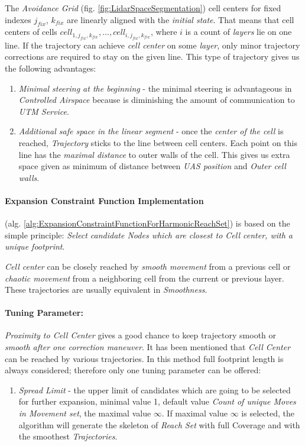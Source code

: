 The \emph{Avoidance Grid} (fig. \ref{fig:LidarSpaceSegmentation}) cell centers for fixed indexes $j_{fix}$, $k_{fix}$ are linearly aligned with the \emph{initial state}. That means that  cell centers of cells $cell_{1,j_{fix},k_{fix}},\dots, cell_{i,j_{fix},k_{fix}}$, where $i$ is a count of \emph{layers} lie on one line.  If the trajectory can achieve \emph{cell center} on some \emph{layer}, only minor trajectory corrections are required to stay on the given line. This type of trajectory gives us the  following advantages:
\begin{enumerate}
    \item\emph{Minimal steering at the beginning} - the minimal steering is advantageous in \emph{Controlled Airspace} because is diminishing the amount of communication to \emph{UTM Service}.
    
    \item\emph{Additional safe space in the linear segment} - once the \emph{center of the cell} is reached, \emph{Trajectory} sticks to the line between cell centers. Each point on this line has the \emph{maximal distance} to outer walls of the cell. This gives us extra space given as minimum of distance between \emph{UAS position} and \emph{Outer cell walls}.
\end{enumerate}

\paragraph{Expansion Constraint Function Implementation} (alg. \ref{alg:ExpansionConstraintFunctionForHarmonicReachSet}) is based on the simple principle: \emph{Select candidate Nodes  which are closest to Cell center, with a unique footprint}.

\begin{note}
    \emph{Cell center} can be closely reached by \emph{smooth movement} from a previous cell or \emph{chaotic movement} from a neighboring cell from the current or previous layer. These trajectories are usually equivalent in \emph{Smoothness}.
\end{note}

\paragraph{Tuning Parameter:} \emph{Proximity to Cell Center} gives a good chance to keep trajectory smooth or \emph{smooth after one correction maneuver}. It has been mentioned that \emph{Cell Center} can be reached by various trajectories. In this method full footprint length is always considered; therefore only one tuning parameter can be offered:
\begin{enumerate}
    \item \emph{Spread Limit} - the upper limit of candidates which are going to be selected for further expansion, minimal value 1, default value \emph{Count of unique Moves in Movement set}, the maximal value $\infty$. If maximal value $\infty$ is selected, the algorithm will generate the skeleton of \emph{Reach Set} with full Coverage and with the smoothest \emph{Trajectories}.
\end{enumerate}

